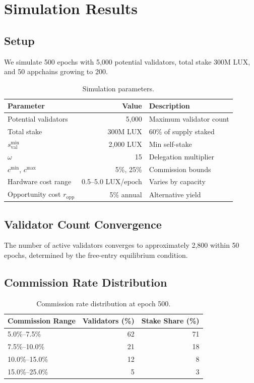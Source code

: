 \section{Simulation Results}
\label{sec:simulation}

\subsection{Setup}

We simulate 500 epochs with 5,000 potential validators, total stake 300M LUX, and 50 appchains growing to 200.

\begin{table}[H]
\centering
\caption{Simulation parameters.}
\label{tab:simparams}
\begin{tabular}{lrl}
\toprule
\textbf{Parameter} & \textbf{Value} & \textbf{Description} \\
\midrule
Potential validators & 5,000 & Maximum validator count \\
Total stake & 300M LUX & 60\% of supply staked \\
$s^{\min}_{\text{val}}$ & 2,000 LUX & Min self-stake \\
$\omega$ & 15 & Delegation multiplier \\
$c^{\min}$, $c^{\max}$ & 5\%, 25\% & Commission bounds \\
Hardware cost range & 0.5--5.0 LUX/epoch & Varies by capacity \\
Opportunity cost $r_{\text{opp}}$ & 5\% annual & Alternative yield \\
\bottomrule
\end{tabular}
\end{table}

\subsection{Validator Count Convergence}

The number of active validators converges to approximately 2,800 within 50 epochs, determined by the free-entry equilibrium condition.

\subsection{Commission Rate Distribution}

\begin{table}[H]
\centering
\caption{Commission rate distribution at epoch 500.}
\label{tab:commission_dist}
\begin{tabular}{lrr}
\toprule
\textbf{Commission Range} & \textbf{Validators (\%)} & \textbf{Stake Share (\%)} \\
\midrule
5.0\%--7.5\% & 62 & 71 \\
7.5\%--10.0\% & 21 & 18 \\
10.0\%--15.0\% & 12 & 8 \\
15.0\%--25.0\% & 5 & 3 \\
\bottomrule
\end{tabular}
\end{table}

